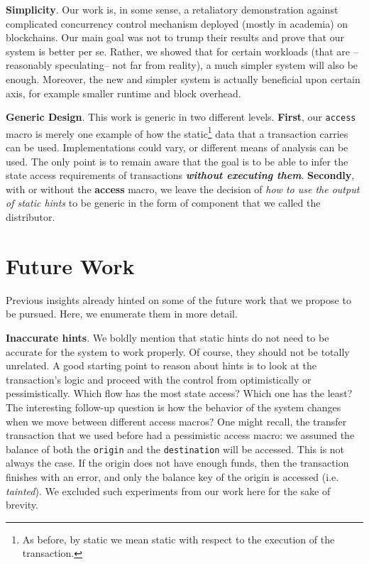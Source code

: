 \textbf{Simplicity}. Our work is, in some sense, a retaliatory demonstration against complicated
concurrency control mechanism deployed (mostly in academia) on blockchains. Our main goal was not to
trump their results and prove that our system is better per se. Rather, we showed that for certain
workloads (that are --reasonably speculating-- not far from reality), a much simpler system will
also be enough. Moreover, the new and simpler system is actually beneficial upon certain axis, for
example smaller runtime and block overhead.

\textbf{Generic Design}. This work is generic in two different levels. \textbf{First}, our
\texttt{access} macro is merely one example of how the static\footnote{As before, by static we mean
static with respect to the execution of the transaction.} data that a transaction carries can be
used. Implementations could vary, or different means of analysis can be used. The only point is to
remain aware that the goal is to be able to infer the state access requirements of transactions
\textit{\textbf{without executing them}}. \textbf{Secondly}, with or without the \textbf{access}
macro, we leave the decision of \textit{how to use the output of static hints} to be generic in the
form of component that we called the distributor.

\section{Future Work}

Previous insights already hinted on some of the future work that we propose to be pursued. Here, we
enumerate them in more detail.

\textbf{Inaccurate hints}. We boldly mention that static hints do not need to be accurate for the
system to work properly. Of course, they should not be totally unrelated. A good starting point to
reason about hints is to look at the transaction's logic and proceed with the control from
optimistically or pessimistically. Which flow has the most state access? Which one has the least?
The interesting follow-up question is how the behavior of the system changes when we move between
different access macros? One might recall, the transfer transaction that we used before had a
pessimistic access macro: we assumed the balance of both the \texttt{origin} and the
\texttt{destination} will be accessed. This is not always the case. If the origin does not have
enough funds, then the transaction finishes with an error, and only the balance key of the origin is
accessed (i.e. \textit{tainted}). We excluded such experiments from our work here for the sake of
brevity.

